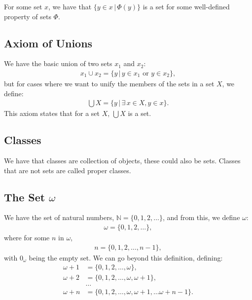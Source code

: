 For some set $x$, we have that $\{y \in x \, | \, \Phi(y)\}$ is a set
for some well-defined property of sets $\Phi$.

\newpage

\subsection{Axiom of Unions}

We have the basic union of two sets $x_1$ and $x_2$: \begin{align*}
    x_1 \cup x_2 = \{y \, | \, y \in x_1 \text{ or } y \in x_2\},
\end{align*} but for cases where we want to unify the members of the sets in
a set $X$, we define: \begin{align*}
    \bigcup X = \{y \, | \, \exists \, x \in X, y \in x\}.
\end{align*} This axiom states that for a set $X$, $\bigcup X$ is a set. 

\subsection{Classes}

We have that classes are collection of objects, these could also be sets.
Classes that are not sets are called proper classes.

\subsection{The Set $\omega$}

We have the set of natural numbers, $\mathbb{N} = \{0, 1, 2, \ldots\}$,
and from this, we define $\omega$: \begin{align*}
    \omega = \{0, 1, 2, \ldots\},
\end{align*} where for some $n$ in $\omega$, \begin{align*}
    n = \{0, 1, 2, \ldots, n - 1\},
\end{align*} with $0_\omega$ being the empty set. We can go beyond this
definition, defining: \begin{align*}
    \omega + 1 &= \{0, 1, 2, \ldots, \omega\}, \\
    \omega + 2 &= \{0, 1, 2, \ldots, \omega, \omega + 1\}, \\
    &\ldots \\
    \omega + n &= \{0, 1, 2, \ldots, \omega, \omega + 1, \ldots \omega + n - 1\}.
\end{align*}

